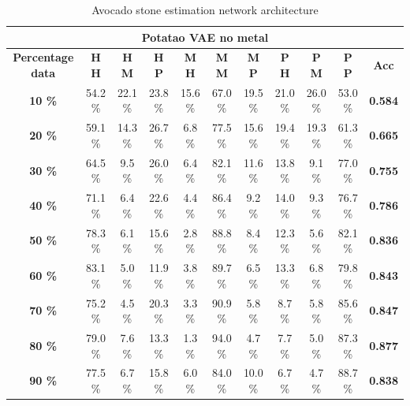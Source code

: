 \documentclass[11pt]{article}
\begin{document}
  \begin{table}[h!]
  \centering
  \begin{adjustbox}{max width=\textwidth}
  \begin{tabular}{*{11}{c}}%
  \hline
  \multicolumn{11}{c}{\textbf{Potatao VAE no metal}}
  \\
 \hline
 \textbf{Percentage data} & \textbf{H H} & \textbf{H M} & \textbf{H P} & \textbf{M H} & \textbf{M M} & \textbf{M P} & \textbf{P H} & \textbf{P M} & \textbf{P P} & \textbf{Acc}\\
 \hline
 \hline
 \textbf{10 \%}  & 54.2 \% & 22.1 \% & 23.8 \% & 15.6 \% & 67.0 \% & 19.5 \% & 21.0 \% & 26.0 \% & 53.0 \% & \textbf{0.584} \\
 \hline
 \textbf{20 \%} & 59.1 \% & 14.3 \% & 26.7 \% & 6.8 \% & 77.5 \% & 15.6 \% & 19.4 \% & 19.3 \% & 61.3 \% & \textbf{0.665} \\
 \hline
 \textbf{30 \%} & 64.5 \% & 9.5 \% & 26.0 \% & 6.4 \% & 82.1 \% & 11.6 \% & 13.8 \% & 9.1 \% & 77.0 \% & \textbf{0.755} \\
 \hline
 \textbf{40 \%} & 71.1 \% & 6.4 \% & 22.6 \% & 4.4 \% & 86.4 \% & 9.2 \% & 14.0 \% & 9.3 \%  & 76.7 \% & \textbf{0.786} \\
 \hline
 \textbf{50 \%} & 78.3 \% & 6.1 \% & 15.6 \% & 2.8 \% & 88.8 \% & 8.4 \% & 12.3 \% & 5.6 \% & 82.1 \% & \textbf{0.836} \\
 \hline
 \textbf{60 \%} & 83.1 \% & 5.0 \% & 11.9 \% & 3.8 \% & 89.7 \% & 6.5 \% & 13.3 \% & 6.8 \% & 79.8 \% & \textbf{0.843} \\
 \hline
 \textbf{70 \%} & 75.2 \% & 4.5 \% & 20.3 \% & 3.3 \% & 90.9 \% & 5.8 \% & 8.7 \% & 5.8 \% & 85.6 \% & \textbf{0.847} \\
 \hline
\textbf{80 \%} & 79.0 \% & 7.6 \% & 13.3 \%  & 1.3 \% & 94.0 \% & 4.7 \% & 7.7 \% & 5.0 \% & 87.3 \% & \textbf{0.877} \\
 \hline
 \textbf{90 \%} & 77.5 \% & 6.7 \% & 15.8 \% & 6.0 \% & 84.0 \% & 10.0 \% & 6.7 \% & 4.7 \% & 88.7 \% & \textbf{0.838} \\
 \hline
\end{tabular}
\end{adjustbox}
  \caption{Avocado stone estimation network architecture}
  \label{tab:experiments_avo_cnn}
\end{table}
\end{document}
